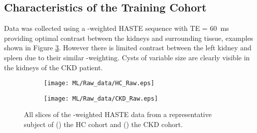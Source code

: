 \subsection{Characteristics of the Training Cohort}

Data was collected using a \ttwo-weighted \ac{HASTE} sequence with TE = 60~ms providing optimal contrast between the kidneys and surrounding tissue, examples shown in Figure \ref{fig:ml_raw}. However there is limited contrast between the left kidney and spleen due to their similar \ttwo-weighting. Cysts of variable size are clearly visible in the kidneys of the \ac{CKD} patient. 

\begin{figure}[H]
	\centering
	\begin{subfigure}[c]{0.47\textwidth}
		\centering
		\texttt{[image: ML/Raw\_data/HC\_Raw.eps]}
		\caption{}
		\label{fig:ml_raw_hc}
	\end{subfigure}
	\hfill
	\begin{subfigure}[c]{0.47\textwidth}
		\centering
		\texttt{[image: ML/Raw\_data/CKD\_Raw.eps]}
		\caption{}
		\label{fig:ml_raw_ckd}
	\end{subfigure}
	\caption{All slices of the \ttwo-weighted \ac{HASTE} data from a representative subject of () the \ac{HC} cohort and () the \ac{CKD} cohort.}
	\label{fig:ml_raw}
\end{figure}

